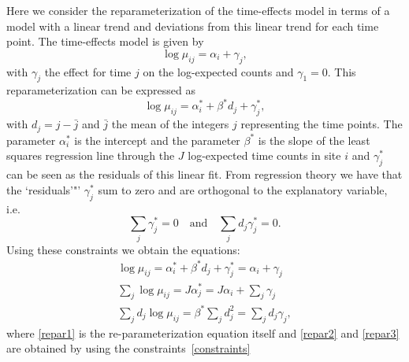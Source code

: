 \documentclass[a4paper]{article}
\begin{document}
Here we consider the reparameterization of the time-effects model in terms of a model with a linear trend and deviations from this linear trend for each time point.
The time-effects model is given by
\begin{equation}
  \log\mu_{ij}=\alpha_i+\gamma_j,
\end{equation}
with $\gamma_j$ the effect for time $j$ on the log-expected counts and $\gamma_1=0$. This reparameterization can be expressed as
\begin{equation}
  \log\mu_{ij}=\alpha^*_i+\beta^*d_j+\gamma^*_j,
\end{equation}
with $d_j=j-\bar{j}$ and $\bar{j}$ the mean of the integers $j$ representing
the time points.
The parameter $\alpha^*_i$ is the intercept and the parameter $\beta^*$ is
the slope of the least squares regression line through the $J$ log-expected
time counts in site $i$ and  $\gamma^*_j$ can be seen as the residuals of this
linear fit.
From regression theory we have that the `residuals'"'  $\gamma^*_j$ sum to zero
and are orthogonal to the explanatory variable, i.e.
\begin{equation}
  \sum_j\gamma^*_j = 0 \quad \text{and} \quad \sum_jd_j\gamma^*_j = 0. \label{constraints}
\end{equation}
Using these constraints we obtain the equations:
\begin{gather}
  \log\mu_{ij}           = \alpha^*_i+\beta^*d_j+\gamma^*_j=\alpha_i+\gamma_j  \label{repar1}\\
  \sum_j \log\mu_{ij}    = J\alpha^*_j = J\alpha_i+\sum_j\gamma_j \label{repar2}\\
  \sum_j d_j\log\mu_{ij} = \beta^*\sum_jd^2_j = \sum_jd_j\gamma_j \label{repar3},
\end{gather}
where \eqref{repar1} is the re-parameterization equation itself and \eqref{repar2}
and \eqref{repar3} are obtained by using the constraints~\eqref{constraints}\par
\end{document}
